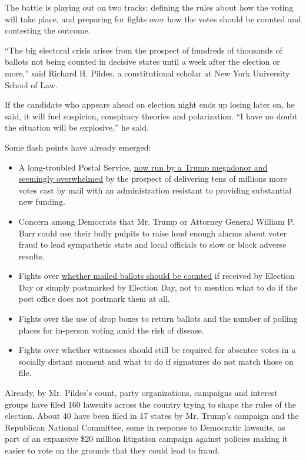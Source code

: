 The battle is playing out on two tracks: defining the rules about how
the voting will take place, and preparing for fights over how the votes
should be counted and contesting the outcome.

``The big electoral crisis arises from the prospect of hundreds of
thousands of ballots not being counted in decisive states until a week
after the election or more,'' said Richard H. Pildes, a constitutional
scholar at New York University School of Law.

If the candidate who appears ahead on election night ends up losing
later on, he said, it will fuel suspicion, conspiracy theories and
polarization. ``I have no doubt the situation will be explosive,'' he
said.

Some flash points have already emerged:

\begin{itemize}
\item
  A long-troubled Postal Service,
  \href{https://www.nytimes.com/2020/07/31/us/politics/trump-usps-mail-delays.html}{now
  run by a Trump megadonor and seemingly overwhelmed} by the prospect of
  delivering tens of millions more votes cast by mail with an
  administration resistant to providing substantial new funding.
\item
  Concern among Democrats that Mr. Trump or Attorney General William P.
  Barr could use their bully pulpits to raise loud enough alarms about
  voter fraud to lead sympathetic state and local officials to slow or
  block adverse results.
\item
  Fights over
  \href{https://www.nytimes.com/2020/08/03/nyregion/nyc-congress-carolyn-maloney-ballots.html}{whether
  mailed ballots should be counted} if received by Election Day or
  simply postmarked by Election Day, not to mention what to do if the
  post office does not postmark them at all.
\item
  Fights over the use of drop boxes to return ballots and the number of
  polling places for in-person voting amid the risk of disease.
\item
  Fights over whether witnesses should still be required for absentee
  votes in a socially distant moment and what to do if signatures do not
  match those on file.
\end{itemize}

Already, by Mr. Pildes's count, party organizations, campaigns and
interest groups have filed 160 lawsuits across the country trying to
shape the rules of the election. About 40 have been filed in 17 states
by Mr. Trump's campaign and the Republican National Committee, some in
response to Democratic lawsuits, as part of an expansive \$20 million
litigation campaign against policies making it easier to vote on the
grounds that they could lead to fraud.

